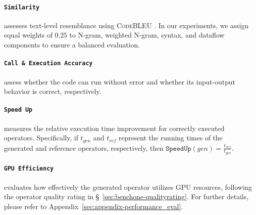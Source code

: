 \paragraph{\texttt{Similarity}} assesses text-level resemblance using \textsc{CodeBLEU} \cite{ren2020codebleu}. In our experiments, we assign equal weights of $0.25$ to N-gram, weighted N-gram, syntax, and dataflow components to ensure a balanced evaluation.
\paragraph{\texttt{Call~\&~Execution Accuracy}} assess whether the code can run without error and whether its input-output behavior is correct, respectively. 
\paragraph{\texttt{Speed Up}} measures the relative execution time improvement for correctly executed operators. Specifically, if \(t_{gen}\) and \(t_{ref}\) represent the running times of the generated and reference operators, respectively, then
\(
\texttt{SpeedUp}(gen) = \frac{t_{ref}}{t_{gen}}.
\)
\paragraph{\texttt{GPU Efficiency}} evaluates how effectively the generated operator utilizes GPU resources, following the operator quality rating in \S~\ref{sec:benchone-qualityrating}. For further details, please refer to Appendix~\ref{sec:appendix-performance_eval}.